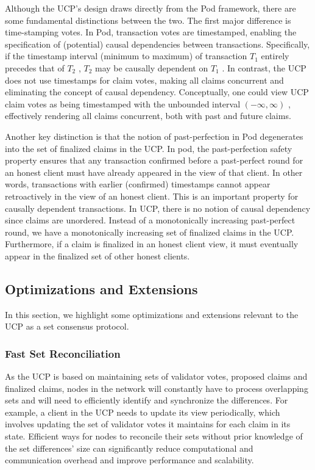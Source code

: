 \documentclass{article}
\newcommand{\UC}{UCP}
\begin{document}
Although the \UC{}'s design draws directly from the Pod framework, there are some fundamental distinctions between the two. The first major difference is time-stamping votes. In Pod, transaction votes are timestamped, enabling the specification of (potential) causal dependencies between transactions. Specifically, if the timestamp interval (minimum to maximum) of transaction  $T_1$  entirely precedes that of  $T_2$ ,  $T_2$  may be causally dependent on  $T_1$ . In contrast, the \UC{} does not use timestamps for claim votes, making all claims concurrent and eliminating the concept of causal dependency. Conceptually, one could view \UC{} claim votes as being timestamped with the unbounded interval  $(-\infty, \infty)$ , effectively rendering all claims concurrent, both with past and future claims.

Another key distinction is that the notion of past-perfection in Pod degenerates into the set of finalized claims in the \UC{}. In pod, the past-perfection safety property ensures that any transaction confirmed before a past-perfect round for an honest client must have already appeared in the view of that client. In other words, transactions with earlier (confirmed) timestamps cannot appear retroactively in the view of an honest client. This is an important property for causally dependent transactions. In \UC{}, there is no notion of causal dependency since claims are unordered. Instead of a monotonically increasing past-perfect round, we have a monotonically increasing set of finalized claims in the \UC{}. Furthermore, if a claim is finalized in an honest client view, it must eventually appear in the finalized set of other honest clients.

\subsection{Optimizations and Extensions}
\label{sec:optimizations}

In this section, we highlight some optimizations and extensions relevant to the \UC{} as a set consensus protocol.

\subsubsection{Fast Set Reconciliation} 

As the \UC{} is based on maintaining sets of validator votes, proposed claims and finalized claims, nodes  in the network will constantly have to process overlapping sets and will need to efficiently identify and synchronize the differences. For example, a client in the \UC{} needs to update its view periodically, which involves updating the set of validator votes it maintains for each claim in its state. Efficient ways for nodes to reconcile their sets without prior knowledge of the set differences’ size can significantly reduce computational and communication overhead and improve performance and scalability.
\end{document}
